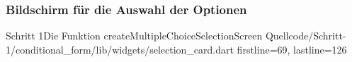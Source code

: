 \clearpage


\subsubsection{Bildschirm für die Auswahl der Optionen}

\blindtext



\blindtext

\blindtext
\blindtext


\begin{alexlisting}{Schritt 1}{Die Funktion createMultipleChoiceSelectionScreen}
  {Quellcode/Schritt-1/conditional_form/lib/widgets/selection_card.dart}
  {firstline=69, lastline=126}
  \label{lst:Schritt1FunktionCreateMultipleChoiceSelectionScreen}
\end{alexlisting}

\clearpage
